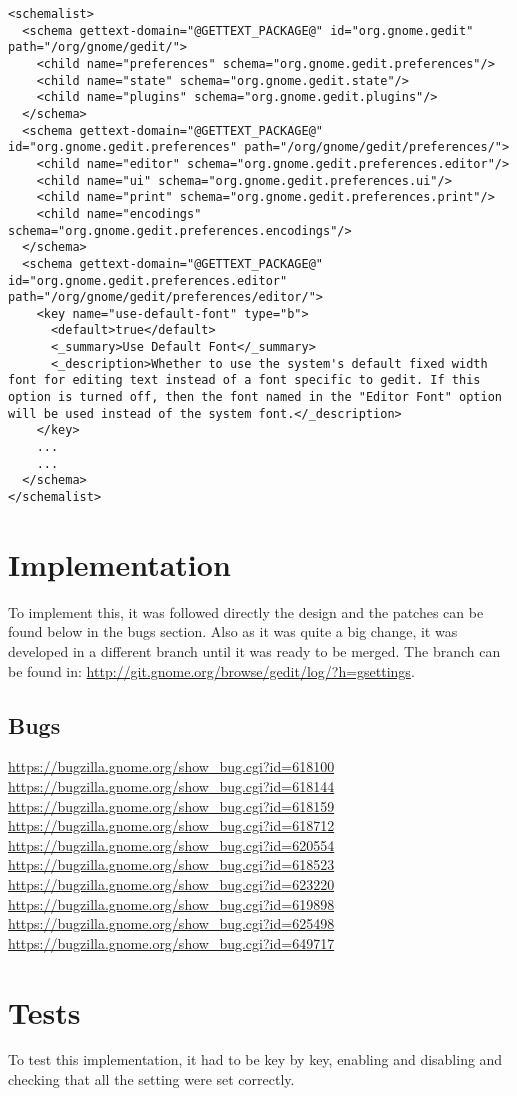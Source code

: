 \begin{lstlisting}[style=xml]
<schemalist>
  <schema gettext-domain="@GETTEXT_PACKAGE@" id="org.gnome.gedit" path="/org/gnome/gedit/">
    <child name="preferences" schema="org.gnome.gedit.preferences"/>
    <child name="state" schema="org.gnome.gedit.state"/>
    <child name="plugins" schema="org.gnome.gedit.plugins"/>
  </schema>
  <schema gettext-domain="@GETTEXT_PACKAGE@" id="org.gnome.gedit.preferences" path="/org/gnome/gedit/preferences/">
    <child name="editor" schema="org.gnome.gedit.preferences.editor"/>
    <child name="ui" schema="org.gnome.gedit.preferences.ui"/>
    <child name="print" schema="org.gnome.gedit.preferences.print"/>
    <child name="encodings" schema="org.gnome.gedit.preferences.encodings"/>
  </schema>
  <schema gettext-domain="@GETTEXT_PACKAGE@" id="org.gnome.gedit.preferences.editor" path="/org/gnome/gedit/preferences/editor/">
    <key name="use-default-font" type="b">
      <default>true</default>
      <_summary>Use Default Font</_summary>
      <_description>Whether to use the system's default fixed width font for editing text instead of a font specific to gedit. If this option is turned off, then the font named in the "Editor Font" option will be used instead of the system font.</_description>
    </key>
    ...
    ...
  </schema>
</schemalist>
\end{lstlisting}

\section{Implementation}

To implement this, it was followed directly the design and the patches can be found below in the bugs section. Also as it was quite a big change, it was developed in a different branch until it was ready to be merged. The branch can be found in: \url{http://git.gnome.org/browse/gedit/log/?h=gsettings}.

\subsection{Bugs}

\noindent\url{https://bugzilla.gnome.org/show_bug.cgi?id=618100}\\
\noindent\url{https://bugzilla.gnome.org/show_bug.cgi?id=618144}\\
\noindent\url{https://bugzilla.gnome.org/show_bug.cgi?id=618159}\\
\noindent\url{https://bugzilla.gnome.org/show_bug.cgi?id=618712}\\
\noindent\url{https://bugzilla.gnome.org/show_bug.cgi?id=620554}\\
\noindent\url{https://bugzilla.gnome.org/show_bug.cgi?id=618523}\\
\noindent\url{https://bugzilla.gnome.org/show_bug.cgi?id=623220}\\
\noindent\url{https://bugzilla.gnome.org/show_bug.cgi?id=619898}\\
\noindent\url{https://bugzilla.gnome.org/show_bug.cgi?id=625498}\\
\noindent\url{https://bugzilla.gnome.org/show_bug.cgi?id=649717}

\section{Tests}

To test this implementation, it had to be key by key, enabling and disabling and checking that all the setting were set correctly.
